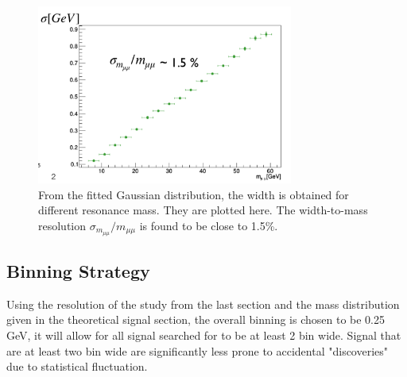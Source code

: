 \begin{figure}[!htb]
    \begin{center}
        \includegraphics[width=0.75\textwidth]{figures/chapter_dimuon/sigma}        
        \caption{
        From the fitted Gaussian distribution, the width is obtained for different resonance mass. They are plotted here. The width-to-mass resolution $\sigma_{m_{\mu\mu}}/m_{\mu\mu}$ is found to be close to 1.5\%.}
    \end{center}
\end{figure}


\subsection{Binning Strategy}
Using the resolution of the study from the last section and the mass distribution given in the theoretical signal section, the overall binning is chosen to be 0.25 GeV, it will allow for all signal searched for to be at least 2 bin wide. Signal that are at least two bin wide are significantly less prone to accidental "discoveries" due to statistical fluctuation.
%

